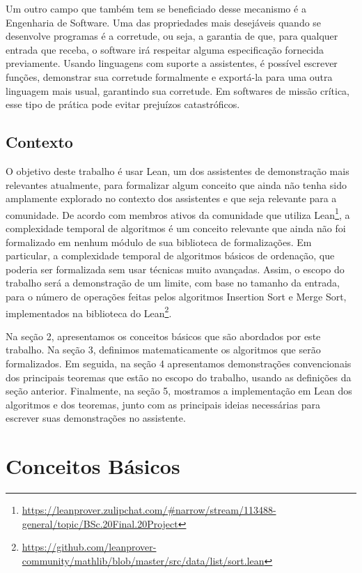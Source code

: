 \documentclass[12pt, oneside, a4paper,english,brazil]{abntex2}
\begin{document}
\qquad Um outro campo que também tem se beneficiado desse mecanismo é a Engenharia
de Software. Uma das propriedades mais desejáveis quando se desenvolve programas é a
corretude, ou seja, a garantia de que, para qualquer entrada que receba, o software irá
respeitar alguma especificação fornecida previamente. Usando linguagens com suporte a
assistentes, é possível escrever funções, demonstrar sua corretude formalmente e exportá-la
para uma outra linguagem mais usual, garantindo sua corretude. Em softwares de miss\~ao cr\'itica,
esse tipo de prática pode evitar prejuízos catastróficos.

\section{Contexto}

\qquad O objetivo deste trabalho \'e usar Lean, um dos assistentes de demonstra\c{c}\~ao
mais relevantes atualmente, para formalizar algum conceito que ainda n\~ao tenha sido
amplamente explorado no contexto dos assistentes e que seja relevante para a comunidade.
De acordo com membros ativos da comunidade  que
utiliza
Lean\footnote{\url{https://leanprover.zulipchat.com/\#narrow/stream/113488-general/topic/BSc.20Final.20Project}}, a complexidade temporal de algoritmos é um conceito relevante que
ainda não foi formalizado em nenhum módulo de sua biblioteca de formaliza\c{c}\~oes.
Em particular, a complexidade temporal de algoritmos básicos de ordenação, que poderia ser
formalizada sem usar técnicas muito avançadas. Assim, o escopo do trabalho será
a demonstração de um limite, com base no tamanho da entrada, para o número de
operações feitas pelos algoritmos Insertion Sort e Merge Sort, implementados na
biblioteca do
Lean\footnote{\url{https://github.com/leanprover-community/mathlib/blob/master/src/data/list/sort.lean}}.

\qquad Na se\c{c}\~ao 2, apresentamos os conceitos b\'asicos que s\~ao abordados por este trabalho.
Na se\c{c}\~ao 3, definimos matematicamente
os algoritmos que ser\~ao formalizados. Em seguida, na se\c{c}\~ao 4 apresentamos
demonstra\c{c}\~oes convencionais dos principais teoremas que est\~ao no escopo
do trabalho, usando as defini\c{c}\~oes da se\c{c}\~ao anterior. Finalmente,
na se\c{c}\~ao 5, mostramos a implementa\c{c}\~ao em Lean dos algoritmos e dos teoremas,
junto com as principais ideias necess\'arias para escrever suas demonstra\c{c}\~oes
no assistente.

\chapter{Conceitos B\'asicos}
\end{document}
